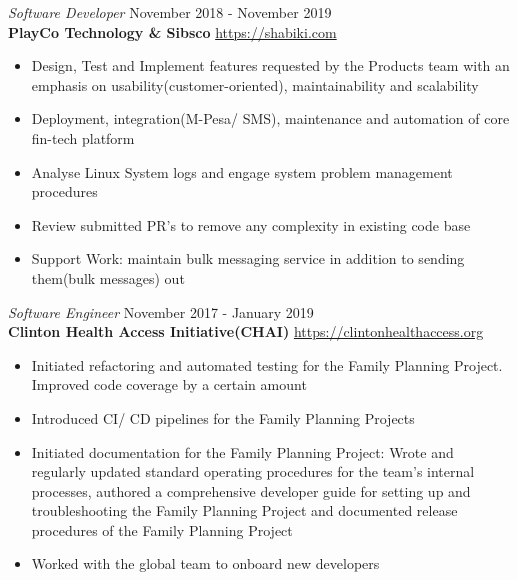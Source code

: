 \documentclass[margin, line]{res} %
\begin{document}

{\sl Software Developer} \hfill November 2018 - November 2019 \\
\textbf{PlayCo Technology \& Sibsco } \hfill \url{https://shabiki.com}
\begin{itemize} \itemsep -2pt
\item Design, Test and Implement features requested by the Products team with an emphasis on usability(customer-oriented), maintainability and scalability
\item Deployment, integration(M-Pesa/ SMS), maintenance and automation of core fin-tech platform
\item Analyse Linux System logs and engage system problem management procedures
\item Review submitted PR’s to remove any complexity in existing code base
\item Support Work: maintain bulk messaging service in addition to sending them(bulk messages) out
\end{itemize}


    {\sl Software Engineer} \hfill November 2017 - January 2019 \\
    \textbf{Clinton Health Access Initiative(CHAI)} \hfill \url{https://clintonhealthaccess.org}
    \begin{itemize} \itemsep -2pt %
    \item Initiated refactoring and automated testing for the Family Planning Project. Improved code coverage by a certain amount
    \item Introduced CI/ CD pipelines for the Family Planning Projects
    \item Initiated documentation for the Family Planning Project: Wrote and regularly updated standard operating procedures for the team's internal processes, authored a comprehensive developer guide for setting up and troubleshooting the Family Planning Project and documented release procedures of the Family Planning Project
    \item Worked with the global team to onboard new developers
    \end{itemize}
\end{document}

